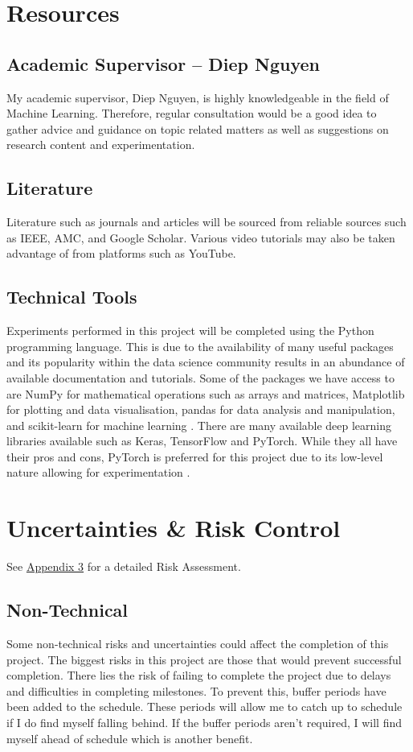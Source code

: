 \documentclass[a4paper,12pt]{report}
\begin{document}
\section{Resources}
\subsection{Academic Supervisor – Diep Nguyen}
My academic supervisor, Diep Nguyen, is highly knowledgeable in the field of Machine Learning. 
Therefore, regular consultation would be a good idea to gather advice and guidance on topic related matters as well as suggestions on research content and experimentation. 

\subsection{Literature}
Literature such as journals and articles will be sourced from reliable sources such as IEEE, AMC, and Google Scholar. 
Various video tutorials may also be taken advantage of from platforms such as YouTube. 

\subsection{Technical Tools}
Experiments performed in this project will be completed using the Python programming language. 
This is due to the availability of many useful packages and its popularity within the data science community results in an abundance of available documentation and tutorials. 
Some of the packages we have access to are NumPy for mathematical operations such as arrays and matrices, Matplotlib for plotting and data visualisation, pandas for data analysis and manipulation, and scikit-learn for machine learning \cite{Justsajid}. 
There are many available deep learning libraries available such as Keras, TensorFlow and PyTorch. 
While they all have their pros and cons, PyTorch is preferred for this project due to its low-level nature allowing for experimentation \cite{deepsense}. 

\section{Uncertainties \& Risk Control}
See \hyperref[sec:app3]{Appendix 3} for a detailed Risk Assessment.

\subsection{Non-Technical}
Some non-technical risks and uncertainties could affect the completion of this project. 
The biggest risks in this project are those that would prevent successful completion. 
There lies the risk of failing to complete the project due to delays and difficulties in completing milestones. 
To prevent this, buffer periods have been added to the schedule. These periods will allow me to catch up to schedule if I do find myself falling behind. 
If the buffer periods aren’t required, I will find myself ahead of schedule which is another benefit.
\end{document}
